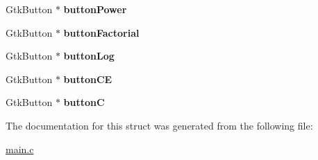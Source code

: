 \begin{DoxyCompactItemize}
\item 
\hypertarget{structApp_abc21780425079bb887428b26a13e741a}{Gtk\+Button $\ast$ {\bfseries button\+Power}}\label{structApp_abc21780425079bb887428b26a13e741a}

\item 
\hypertarget{structApp_a98c3dd95028c439f0b0090746c95b61a}{Gtk\+Button $\ast$ {\bfseries button\+Factorial}}\label{structApp_a98c3dd95028c439f0b0090746c95b61a}

\item 
\hypertarget{structApp_a6c4fa01e0baba1579b6e121b0c494539}{Gtk\+Button $\ast$ {\bfseries button\+Log}}\label{structApp_a6c4fa01e0baba1579b6e121b0c494539}

\item 
\hypertarget{structApp_a3820fc1ae03e159040a4750ad420050c}{Gtk\+Button $\ast$ {\bfseries button\+C\+E}}\label{structApp_a3820fc1ae03e159040a4750ad420050c}

\item 
\hypertarget{structApp_a4e9ac36442d9db4f7c0191f8eeb0b712}{Gtk\+Button $\ast$ {\bfseries button\+C}}\label{structApp_a4e9ac36442d9db4f7c0191f8eeb0b712}

\end{DoxyCompactItemize}


The documentation for this struct was generated from the following file\+:\begin{DoxyCompactItemize}
\item 
\hyperlink{main_8c}{main.\+c}\end{DoxyCompactItemize}
